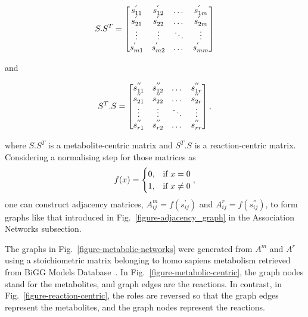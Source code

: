 \noindent\begin{minipage}{.5\linewidth}
	\begin{equation}
		S.S^{T} =  \begin{bmatrix}
			s^{'}_{11} & s^{'}_{12} & \dots  & s^{'}_{1m}\\
			s^{'}_{21} & s^{'}_{22} & \dots  & s^{'}_{2m}\\
			\vdots & \vdots &\ddots & \vdots \\
			s^{'}_{m1} & s^{'}_{m2} & \dots & s^{'}_{mm} 
		\end{bmatrix}
		\notag
	\end{equation}
\end{minipage} and
\begin{minipage}{.5\linewidth}
	\begin{equation}
		S^{T}.S =  \begin{bmatrix}
			s^{''}_{11} & s^{''}_{12} & \dots  & s^{''}_{1r}\\
			s^{''}_{21} & s^{''}_{22} & \dots  & s^{''}_{2r}\\
			\vdots & \vdots &\ddots & \vdots \\
			s^{''}_{r1} & s^{''}_{r2} & \dots & s^{''}_{rr} 
		\end{bmatrix},
		\notag
	\end{equation}
\end{minipage}

where $S.S^{T}$ is a metabolite-centric matrix and $S^{T}.S$ is a reaction-centric matrix. Considering a normalising step for those matrices as 
\begin{equation}
	f(x) =
	\begin{cases}
		0, & \text{if}\ x = 0 \\
		1, & \text{if}\ x \neq 0
	\end{cases},
	\notag
\end{equation}
one can construct adjacency matrices, $A^{m}_{ij}=f(s^{'}_{ij})$ and $A^{r}_{ij}=f(s^{''}_{ij})$, to form graphs like that introduced in Fig.~\ref{figure-adjacency_graph} in the Association Networks subsection. 

The graphs in Fig.~\ref{figure-metabolic-networks} were generated from $A^{m}$ and $A^{r}$ using a stoichiometric matrix belonging to homo sapiens metabolism retrieved from BiGG Models Database~\cite{biggmodels}. In Fig.~\ref{figure-metabolic-centric}, the graph nodes stand for the metabolites, and graph edges are the reactions. In contrast, in Fig.~\ref{figure-reaction-centric}, the roles are reversed so that the graph edges represent the metabolites, and the graph nodes represent the reactions.


